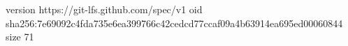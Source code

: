 version https://git-lfs.github.com/spec/v1
oid sha256:7e69092c4fda735e6ea399766c42cedcd77ccaf09a4b63914ea695ed00060844
size 71

